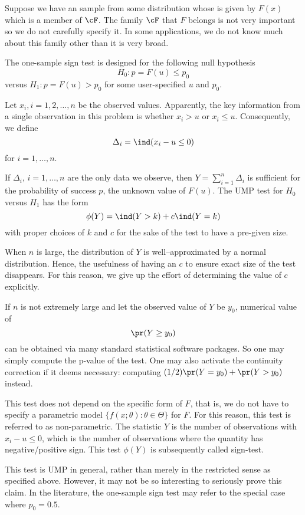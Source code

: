 Suppose we have an \iid sample from some distribution 
whose \cdf is given by $F(x)$ which is a member of $\cF$. 
The family $\cF$ that $F$ belongs
is not very important so we do not carefully specify it.
In some applications, we do not know much about this
family other than it is very broad.

The one-sample sign test is designed for the following null hypothesis
\[
H_0: p = F(u) \leq p_0
\]
versus 
$
H_1: p= F(u) > p_0
$ 
for some user-specified $u$ and $p_0$.

Let $x_i, i=1, 2, \ldots, n$ be the observed values.
Apparently, the key information from a single observation
in this problem is whether $x_i > u$ or $x_i \leq u$.
Consequently, we define
\[
\Delta_i = \ind( x_i - u \leq 0)
\]
for $i=1, \ldots, n$.

If $\Delta_i$, $i=1, \ldots, n$ are the only data we observe,
then $Y = \sum_{i=1}^n \Delta_i$ is sufficient for the
probability of success $p$, the unknown value of $F(u)$.
The UMP test for $H_0$ versus $H_1$ has the form
\[
\phi(Y) = \ind(Y > k) + c \ind(Y = k)
\]
with proper choices of $k$ and $c$ for the sake of
the test to have a pre-given size.

When $n$ is large, the distribution of $Y$ is well--approximated
by a normal distribution. Hence, the usefulness of having
an $c$ to ensure exact size of the test disappears.
For this reason, we give up the effort of determining
the value of $c$ explicitly.

If $n$ is not extremely large and let the observed
value of $Y$ be $y_0$, numerical value of
\[
\pr ( Y \geq y_0)
\]
can be obtained via many standard statistical software packages.
So one may simply compute the p-value of the test.
One may also activate the continuity correction 
if it deems necessary: computing
$(1/2) \pr ( Y = y_0) + \pr ( Y  > y_0)$ instead.

This test does not depend on the specific form of $F$,
that is, we do not have to specify a parametric model $\{f(x; \theta): \theta \in \Theta\}$
for $F$. For this reason, this test is referred to as non-parametric. 
The statistic $Y$ is the number of observations with $x_i - u \leq 0$, 
which is the number of observations
where the quantity has negative/positive sign. 
This test $\phi(Y)$ is subsequently called sign-test.

This test is UMP in general, rather than merely in the
restricted sense as specified above. However, it may
not be so interesting to seriously prove this claim.
In the literature, the one-sample sign test may refer to the
special case where $p_0 = 0.5$.

